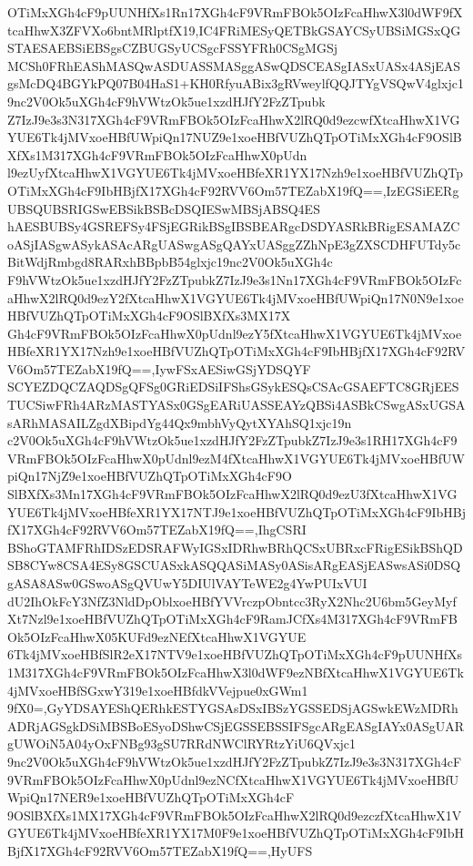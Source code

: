 \documentclass[multi=frame]{standalone}
\begin{document}
\begin{world}
        OTiMxXGh4cF9pUUNHfXs1Rn17XGh4cF9VRmFBOk5OIzFcaHhwX3l0dWF9fXtcaHhwX3ZFVXo6bntMRlptfX19,IC4FRiMESyQETBkGSAYCSyUBSiMGSxQGSTAESAEBSiEBSgsCZBUGSyUCSgcFSSYFRh0CSgMGSj
        MCSh0FRhEAShMASQwASDUASSMASggASwQDSCEASgIASxUASx4ASjEASgsMcDQ4BGYkPQ07B04HaS1+KH0RfyuABix3gRVweylfQQJTYgVSQwV4glxjc19nc2V0Ok5uXGh4cF9hVWtzOk5ue1xzdHJfY2FzZTpubk
        Z7IzJ9e3s3N317XGh4cF9VRmFBOk5OIzFcaHhwX2lRQ0d9ezcwfXtcaHhwX1VGYUE6Tk4jMVxoeHBfUWpiQn17NUZ9e1xoeHBfVUZhQTpOTiMxXGh4cF9OSlBXfXs1M317XGh4cF9VRmFBOk5OIzFcaHhwX0pUdn
        l9ezUyfXtcaHhwX1VGYUE6Tk4jMVxoeHBfeXR1YX17Nzh9e1xoeHBfVUZhQTpOTiMxXGh4cF9IbHBjfX17XGh4cF92RVV6Om57TEZabX19fQ==,IzEGSiEERgUBSQUBSRIGSwEBSikBSBcDSQIESwMBSjABSQ4ES
        hAESBUBSy4GSREFSy4FSjEGRikBSgIBSBEARgcDSDYASRkBRigESAMAZCoASjIASgwASykASAcARgUASwgASgQAYxUASggZZhNpE3gZXSCDHFUTdy5cBitWdjRmbgd8RARxhBBpbB54glxjc19nc2V0Ok5uXGh4c
        F9hVWtzOk5ue1xzdHJfY2FzZTpubkZ7IzJ9e3s1Nn17XGh4cF9VRmFBOk5OIzFcaHhwX2lRQ0d9ezY2fXtcaHhwX1VGYUE6Tk4jMVxoeHBfUWpiQn17N0N9e1xoeHBfVUZhQTpOTiMxXGh4cF9OSlBXfXs3MX17X
        Gh4cF9VRmFBOk5OIzFcaHhwX0pUdnl9ezY5fXtcaHhwX1VGYUE6Tk4jMVxoeHBfeXR1YX17Nzh9e1xoeHBfVUZhQTpOTiMxXGh4cF9IbHBjfX17XGh4cF92RVV6Om57TEZabX19fQ==,IywFSxAESiwGSjYDSQYF
        SCYEZDQCZAQDSgQFSg0GRiEDSiIFShsGSykESQsCSAcGSAEFTC8GRjEESTUCSiwFRh4ARzMASTYASx0GSgEARiUASSEAYzQBSi4ASBkCSwgASxUGSAsARhMASAILZgdXBipdYg44Qx9mbhVyQytXYAhSQ1xjc19n
        c2V0Ok5uXGh4cF9hVWtzOk5ue1xzdHJfY2FzZTpubkZ7IzJ9e3s1RH17XGh4cF9VRmFBOk5OIzFcaHhwX0pUdnl9ezM4fXtcaHhwX1VGYUE6Tk4jMVxoeHBfUWpiQn17NjZ9e1xoeHBfVUZhQTpOTiMxXGh4cF9O
        SlBXfXs3Mn17XGh4cF9VRmFBOk5OIzFcaHhwX2lRQ0d9ezU3fXtcaHhwX1VGYUE6Tk4jMVxoeHBfeXR1YX17NTJ9e1xoeHBfVUZhQTpOTiMxXGh4cF9IbHBjfX17XGh4cF92RVV6Om57TEZabX19fQ==,IhgCSRI
        BShoGTAMFRhIDSzEDSRAFWyIGSxIDRhwBRhQCSxUBRxcFRigESikBShQDSB8CYw8CSA4ESy8GSCUASxkASQQASiMASy0ASisARgEASjEASwsASi0DSQgASA8ASw0GSwoASgQVUwY5DIUlVAYTeWE2g4YwPUIxVUI
        dU2IhOkFcY3NfZ3NldDpOblxoeHBfYVVrczpObntcc3RyX2Nhc2U6bm5GeyMyfXt7Nzl9e1xoeHBfVUZhQTpOTiMxXGh4cF9RamJCfXs4M317XGh4cF9VRmFBOk5OIzFcaHhwX05KUFd9ezNEfXtcaHhwX1VGYUE
        6Tk4jMVxoeHBfSlR2eX17NTV9e1xoeHBfVUZhQTpOTiMxXGh4cF9pUUNHfXs1M317XGh4cF9VRmFBOk5OIzFcaHhwX3l0dWF9ezNBfXtcaHhwX1VGYUE6Tk4jMVxoeHBfSGxwY319e1xoeHBfdkVVejpue0xGWm1
        9fX0=,GyYDSAYEShQERhkESTYGSAsDSxIBSzYGSSEDSjAGSwkEWzMDRhADRjAGSgkDSiMBSBoESyoDShwCSjEGSSEBSSIFSgcARgEASgIAYx0ASgUARgUWOiN5A04yOxFNBg93gSU7RRdNWClRYRtzYiU6QVxjc1
        9nc2V0Ok5uXGh4cF9hVWtzOk5ue1xzdHJfY2FzZTpubkZ7IzJ9e3s3N317XGh4cF9VRmFBOk5OIzFcaHhwX0pUdnl9ezNCfXtcaHhwX1VGYUE6Tk4jMVxoeHBfUWpiQn17NER9e1xoeHBfVUZhQTpOTiMxXGh4cF
        9OSlBXfXs1MX17XGh4cF9VRmFBOk5OIzFcaHhwX2lRQ0d9ezczfXtcaHhwX1VGYUE6Tk4jMVxoeHBfeXR1YX17M0F9e1xoeHBfVUZhQTpOTiMxXGh4cF9IbHBjfX17XGh4cF92RVV6Om57TEZabX19fQ==,HyUFS

\end{world}
\end{document}
